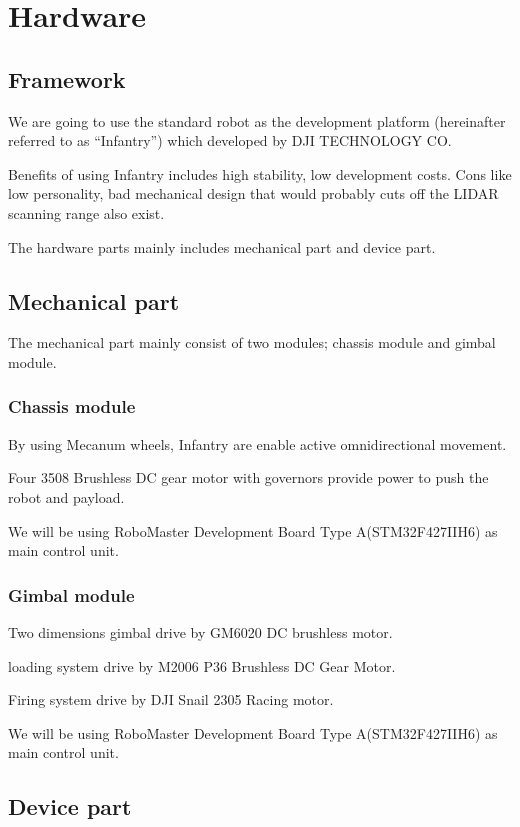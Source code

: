\section{Hardware} 
\subsection{Framework}

We are going to use the standard robot as the development platform (hereinafter referred to as “Infantry”) which developed by DJI TECHNOLOGY CO.

Benefits of using Infantry includes high stability, low development costs.
Cons like low personality, bad mechanical design that would probably cuts off the LIDAR scanning range also exist.

The hardware parts mainly includes mechanical part and device part.

\subsection{Mechanical part}

The mechanical part mainly consist of two modules; chassis module and gimbal module.

\subsubsection{Chassis module}

By using Mecanum wheels, Infantry are enable active omnidirectional movement.

Four 3508 Brushless DC gear motor with governors provide power to push the robot and payload.

We will be using RoboMaster Development Board Type A(STM32F427IIH6) as main control unit.

\subsubsection{Gimbal module}

Two dimensions gimbal drive by GM6020 DC brushless motor.

loading system drive by M2006 P36 Brushless DC Gear Motor.

Firing system drive by DJI Snail 2305 Racing motor.

We will be using RoboMaster Development Board Type A(STM32F427IIH6) as main control unit.

\subsection{Device part}
